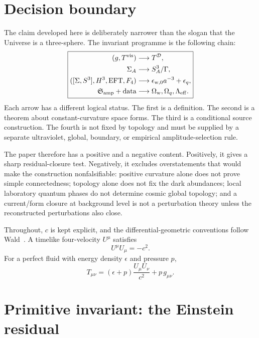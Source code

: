 \documentclass[
  aps,
  prd,
  reprint,
  superscriptaddress,
  floatfix,
  nofootinbib,
  longbibliography
]{revtex4-2}
\theoremstyle{plain}
\theoremstyle{definition}
\theoremstyle{remark}
\newcommand{\D}{\mathcal D}
\newcommand{\vis}{\mathrm{vis}}
\newcommand{\w}{\mathrm w}
\newcommand{\eff}{\mathrm{eff}}
\newcommand{\amp}{\mathrm{amp}}
\newcommand{\Ow}{\Omega_{\mathrm w}}
\newcommand{\Oq}{\Omega_q}
\newcommand{\eps}{\epsilon}
\begin{document}
\section{Decision boundary}

The claim developed here is deliberately narrower than the slogan that the Universe is a three-sphere.  The invariant programme is the following chain:
\begin{equation}
\boxed{
\begin{aligned}
(g,T^{\vis})&\longrightarrow T^\D,\\
\Sigma_A&\longrightarrow S^3_A/\Gamma,\\
([\Sigma,S^3],H^3,\hbox{EFT},F_4)&\longrightarrow
\eps_{\w,0}a^{-3}+\eps_q,\\
\mathfrak S_{\amp}+\hbox{data}&\longrightarrow
\Ow,\Oq,\Lambda_{\eff}.
\end{aligned}}
\label{eq:programme_chain}
\end{equation}
Each arrow has a different logical status.  The first is a definition.  The second is a theorem about constant-curvature space forms.  The third is a conditional source construction.  The fourth is not fixed by topology and must be supplied by a separate ultraviolet, global, boundary, or empirical amplitude-selection rule.

The paper therefore has a positive and a negative content.  Positively, it gives a sharp residual-closure test.  Negatively, it excludes overstatements that would make the construction nonfalsifiable: positive curvature alone does not prove simple connectedness; topology alone does not fix the dark abundances; local laboratory quantum phases do not determine cosmic global topology; and a current/form closure at background level is not a perturbation theory unless the reconstructed perturbations also close.

Throughout, \(c\) is kept explicit, and the differential-geometric conventions follow Wald~\cite{Wald}.  A timelike four-velocity \(U^\mu\) satisfies
\begin{equation}
U^\mu U_\mu=-c^2 .
\label{eq:U_norm}
\end{equation}
For a perfect fluid with energy density \(\eps\) and pressure \(p\),
\begin{equation}
T_{\mu\nu}=(\eps+p)\frac{U_\mu U_\nu}{c^2}+p\,g_{\mu\nu}.
\label{eq:perfect_fluid_convention}
\end{equation}

\section{Primitive invariant: the Einstein residual}
\end{document}
